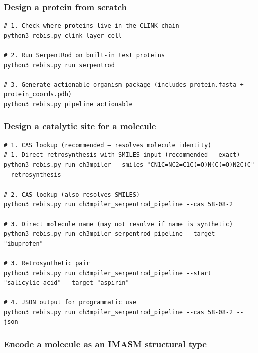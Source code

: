 \hypertarget{design-a-protein-from-scratch}{%
\subsubsection{Design a protein from
scratch}\label{design-a-protein-from-scratch}}

\begin{verbatim}
# 1. Check where proteins live in the CLINK chain
python3 rebis.py clink layer cell

# 2. Run SerpentRod on built-in test proteins
python3 rebis.py run serpentrod

# 3. Generate actionable organism package (includes protein.fasta + protein_coords.pdb)
python3 rebis.py pipeline actionable
\end{verbatim}

\hypertarget{design-a-catalytic-site-for-a-molecule}{%
\subsubsection{Design a catalytic site for a
molecule}\label{design-a-catalytic-site-for-a-molecule}}

\begin{verbatim}
# 1. CAS lookup (recommended — resolves molecule identity)
# 1. Direct retrosynthesis with SMILES input (recommended — exact)
python3 rebis.py run ch3mpiler --smiles "CN1C=NC2=C1C(=O)N(C(=O)N2C)C" --retrosynthesis

# 2. CAS lookup (also resolves SMILES)
python3 rebis.py run ch3mpiler_serpentrod_pipeline --cas 58-08-2

# 3. Direct molecule name (may not resolve if name is synthetic)
python3 rebis.py run ch3mpiler_serpentrod_pipeline --target "ibuprofen"

# 3. Retrosynthetic pair
python3 rebis.py run ch3mpiler_serpentrod_pipeline --start "salicylic_acid" --target "aspirin"

# 4. JSON output for programmatic use
python3 rebis.py run ch3mpiler_serpentrod_pipeline --cas 58-08-2 --json
\end{verbatim}

\hypertarget{encode-a-molecule-as-an-imasm-structural-type}{%
\subsubsection{Encode a molecule as an IMASM structural
type}\label{encode-a-molecule-as-an-imasm-structural-type}}

